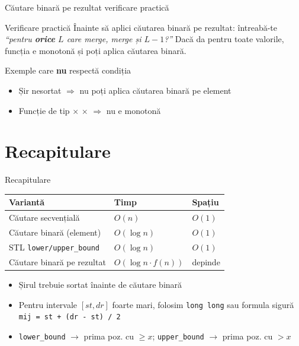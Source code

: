 ﻿\documentclass{beamer}
\begin{document}
\begin{frame}{Căutare binară pe rezultat \textemdash{} verificare practică}
  \begin{block}{Verificare practică}
    Înainte să aplici căutarea binară pe rezultat: întreabă-te \emph{``pentru \textbf{orice} $L$ care merge, merge și $L-1$?''}
    Dacă da pentru toate valorile, funcția e monotonă și poți aplica căutarea binară.
  \end{block}

  \smallskip
  \begin{block}{Exemple care \textbf{nu} respectă condiția}
    \begin{itemize}
      \item Șir nesortat $\Rightarrow$ nu poți aplica căutarea binară pe element
      \item Funcție de tip \checkmark $\times$ \checkmark $\times$ \checkmark $\Rightarrow$ nu e monotonă
    \end{itemize}
  \end{block}
\end{frame}

\section{Recapitulare}

\begin{frame}{Recapitulare}
  \begin{center}
  \begin{tabular}{lll}
    \toprule
    Variantă & Timp & Spațiu \\
    \midrule
    Căutare secvențială              & $O(n)$      & $O(1)$ \\
    Căutare binară (element)         & $O(\log n)$ & $O(1)$ \\
    STL \texttt{lower/upper\_bound}  & $O(\log n)$ & $O(1)$ \\
    Căutare binară pe rezultat     & $O(\log n \cdot f(n))$ & depinde \\ 
    \bottomrule
  \end{tabular}
  \end{center}

  \smallskip
  \begin{itemize}
    \item Șirul trebuie sortat înainte de căutare binară
    \item Pentru intervale $[st, dr]$ foarte mari, folosim \lstinline|long long| sau formula sigură \lstinline[keepspaces=true]|mij = st + (dr - st) / 2|
    \item \texttt{lower\_bound} $\rightarrow$ prima poz. cu $\geq x$; \texttt{upper\_bound} $\rightarrow$ prima poz. cu $> x$
  \end{itemize}
\end{frame}
\end{document}
